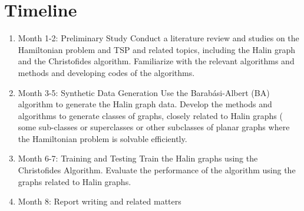 \documentclass{article}
\begin{document}
\section{Timeline}
\begin{enumerate}
\item Month 1-2: Preliminary Study
Conduct a literature review and studies on the Hamiltonian problem and TSP and related topics, including the Halin graph and the Christofides algorithm. Familiarize with the relevant algorithms and methods and developing codes of the algorithms.

\item Month 3-5: Synthetic Data Generation
Use the Barabási-Albert (BA) algorithm to generate the Halin graph data. Develop the methods and algorithms to generate classes of graphs, closely related to Halin graphs ( some sub-classes or superclasses or other subclasses of planar graphs where the Hamiltonian problem is solvable efficiently. 

\item Month 6-7: Training and Testing
Train the Halin graphs using the Christofides Algorithm.
Evaluate the performance of the algorithm using the graphs related to Halin graphs.
\item Month 8: Report writing and related matters 

\end{enumerate}
\end{document}
